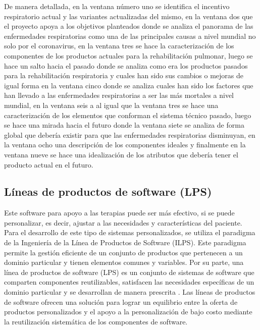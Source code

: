 De manera detallada, en la ventana n\'umero uno se identifica el incentivo respiratorio actual y las variantes actualizadas del mismo, en la ventana dos que el proyecto apoya a los objetivos planteados donde se analiza el panorama de las enfermedades respiratorias como una de las principales causas a nivel mundial no solo por el coronavirus, en la ventana tres se hace la caracterizaci\'on de los componentes de los productos actuales para la rehabilitaci\'on pulmonar, luego se hace un salto hacia el pasado donde se analiza como era los productos pasados para la rehabilitaci\'on respiratoria y cuales han sido sus cambios o mejoras de igual forma en la ventana cinco donde se analiza cuales han sido los factores que han llevado a las enfermedades respiratorias a ser las m\'as mortales a nivel mundial, en la ventana seis a al igual que la ventana tres se hace una caracterizaci\'on de los elementos que conforman el sistema t\'ecnico pasado, luego se hace una mirada hacia el futuro donde la ventana siete se analiza de forma global que deber\'ia existir para que las enfermedades respiratorias disminuyan, en la ventana ocho una descripci\'on de los componentes ideales y finalmente en la ventana nueve se hace una idealizaci\'on de los atributos que deber\'ia tener el producto actual en el futuro.

\subsection{L\'ineas de productos de software (LPS)}

Este software para apoyo a las terapias puede ser m\'as efectivo, si se puede personalizar, es decir, ajustar a las necesidades y caracter\'isticas del paciente. Para el desarrollo de este tipo de sistemas personalizados, se utiliza el paradigma de la Ingenier\'ia de la L\'inea de Productos de Software (ILPS). Este paradigma permite la gesti\'on eficiente de un conjunto de productos que pertenecen a un dominio particular y tienen elementos comunes y variables. Por su parte, una l\'inea de productos de software (LPS) es un conjunto de sistemas de software que comparten componentes reutilizables, satisfacen las necesidades espec\'ificas de un dominio particular y se desarrollan de manera prescrita \cite{14}. Las l\'ineas de productos de software ofrecen una soluci\'on para lograr un equilibrio entre la oferta de productos personalizados y el apoyo a la personalizaci\'on de bajo costo mediante la reutilizaci\'on sistem\'atica de los componentes de software.

